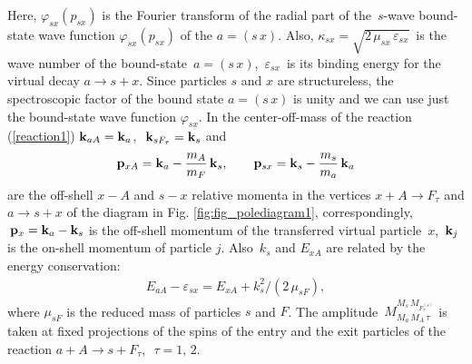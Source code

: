 \documentclass[prl,unsortedaddress,groupedaddress,twocolumn,amsmath,amsfonts,amssymb,showpacs,floatfix,nofootinbib]{revtex4}
\begin{document}
Here, $\varphi_{sx}(p_{sx})$ is the Fourier transform of the radial part of the $\,s$-wave bound-state wave function $\varphi_{sx}(p_{sx})$ of the $a=(s\,x)$.  Also, $\kappa_{sx}=\sqrt{ 2\,\mu_{sx}\,\varepsilon_{sx}}\,$ is the wave number of the bound-state $\,a=(s\,x)$, $\,\varepsilon_{sx}\,$ is its binding energy for the virtual decay  $a \to s+ x$. Since  particles $s$ and $x$  are structureless,  the spectroscopic factor of the bound state $a=(s\,x)$ is unity and we can use just the bound-state wave function $\varphi_{sx}$. In the center-off-mass of the reaction (\ref{reaction1})  ${\rm {\bf k}}_{aA}= {\rm {\bf k}}_{a}$, $\,\,{\rm {\bf k}}_{sF_{\tau}}={\rm {\bf k}}_{s}$ and  
\begin{align}
{\rm {\bf p}}_{xA}=  {\rm {\bf  k}}_{a} - \frac{m_{A}}{m_{F}}\,{\rm {\bf k}}_{s},    \qquad
{\rm {\bf p}}_{sx}= {\rm {\bf k}}_{s} - \frac{m_{s}}{m_{a}}\,{\rm {\bf k}}_{a}
\label{pxA1psx1}
\end{align}
are the off-shell $x-A$ and $s-x$ relative momenta in the vertices $x+ A \to F_{\tau}$ and $a \to s+x$ of the  diagram in Fig. \ref{fig:fig_polediagram1}, correspondingly,
 $\,{\rm {\bf p}}_{x} = {\rm {\bf k}}_{a} - {\rm {\bf k}}_{s}$  is the off-shell momentum of the transferred virtual particle $\,x$, $\,{\rm {\bf k}}_{j}$ is the on-shell momentum of particle $j$.  Also $\,k_{s}$ and $E_{xA}$ are related by the energy conservation:
\begin{align}
E_{aA} - \varepsilon_{sx} = E_{xA} + k_{s}^{2}/(2\,\mu_{sF}), 
\label{energconserv1}
\end{align}
where $\mu_{sF}$ is the reduced mass of particles $s$ and $F$.
The amplitude $\,M_{M_{a}\,M_{A}\,\tau}^{M_{s}\,M_{F_{\tau}^{(s)}}}$ is taken at fixed projections of the spins of the entry  and the exit  particles of the reaction $a+ A \to s + F_{\tau}$,   $\,\,\tau=1,\,2$.
\end{document}
